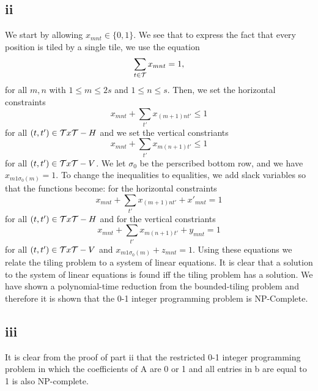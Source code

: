 \documentclass[12pt]{article}
\begin{document}
\subsection*{ii}
We start by allowing $x_{mnt} \in \{0,1\}$.  We see that to express the fact that every position is tiled by a
single tile, we use the equation
\[
\sum_{t\in {\cal T}} x_{m n t} = 1,
\]
for all $m, n$ with $1 \leq m \leq 2 s$ and $1 \leq n \leq s$.
Then, we set the horizontal constraints 
\[
x_{mnt} + \sum_{t'} x_{(m+1) n t'} \le 1
\] 
for all $(t,t') \in {\cal T} x {\cal T} - H$ and we set the vertical constriants 
\[
x_{mnt} + \sum_{t'} x_{m (n+1) t'} \le 1
\] 
for all $(t,t') \in {\cal T} x {\cal T} - V$.  We let $\sigma_0$ be the perscribed bottom row, and we have $x_{m1\sigma_0 (m)} = 1$. To change the inequalities to equalities, we add slack variables so that the functions become: for the horizontal constraints
\[
x_{mnt} + \sum_{t'} x_{(m+1) n t'} + x'_{mnt} = 1
\]
for all $(t,t') \in {\cal T} x {\cal T} - H$ and for the vertical constriants
\[
x_{mnt} + \sum_{t'} x_{m (n+1) t'} + y_{mnt}  = 1
\]
for all $(t,t') \in {\cal T} x {\cal T} - V$ and $x_{m1\sigma_0 (m)} + z_{mnt} = 1$.
Using these equations we relate the tiling problem to a system of linear equations.  It is clear that a solution to the system of linear equations is found iff the tiling problem has a solution. We have shown a polynomial-time reduction from the bounded-tiling problem and therefore it is shown that the 0-1 integer programming problem is NP-Complete.  

\subsection*{iii}
It is clear from the proof of part ii that the restricted 0-1 integer programming problem in which the coefficients of A are 0 or 1 and all entries in b are equal to 1 is also NP-complete.
\end{document}
